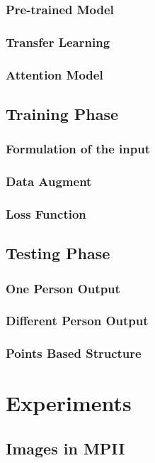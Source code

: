 \documentclass[senior]{IPSstyle}
\begin{document}
\subsection{Pre-trained Model}
\subsection{Transfer Learning}
\subsection{Attention Model}

\section{Training Phase} \label{training phase}
\subsection{Formulation of the input}
\subsection{Data Augment}
\subsection{Loss Function}


\section{Testing Phase} \label{testing phase}
\subsection{One Person Output}
\subsection{Different Person Output}
\subsection{Points Based Structure}

\chapter{Experiments} \label{experiments}
\section{Images in MPII}
\end{document}
